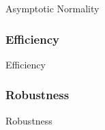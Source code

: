 \begin{definition}{Asymptotic Normality}{}
    
\end{definition}

\subsubsection*{Efficiency}

\begin{definition}{Efficiency}{}
    
\end{definition}

\subsubsection*{Robustness}

\begin{definition}{Robustness}{}
    
\end{definition}
